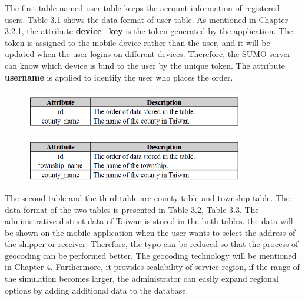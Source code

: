 \documentclass[12pt]{ksthesis}
\begin{document}
\begin{thesis}
{ 
The first table named user-table keeps the account information of registered users. Table 3.1 shows the data format of user-table. As mentioned in Chapter 3.2.1, the attribute \textbf{device\_key} is the token generated by the application. The token is assigned to the mobile device rather than the user, and it will be updated when the user logins on different devices. Therefore, the SUMO server can know which device is bind to the user by the unique token. The attribute \textbf{username} is applied to identify the user who places the order.





\begin{figure}[H]
\centering
{}
\includegraphics[width=0.85\textwidth]{./figures/Table3-2-CountyTable.PNG}
\vspace{0.5cm}
\label{Fig:CountyTable}
\end{figure}

\begin{figure}[H]
\centering
{}
\includegraphics[width=0.85\textwidth]{./figures/Table3-3-TownshipTable.PNG}
\vspace{0.5cm}
\label{Fig:TownshipTable}
\end{figure}

The second table and the third table are county table and township table. The data format of the two tables is presented in Table 3.2, Table 3.3. The administrative district data of Taiwan is stored in the both tables. the data will be shown on the mobile application when the user wants to select the address of the shipper or receiver. Therefore, the typo can be reduced so that the process of geocoding can be performed better. 
The geocoding technology will be mentioned in Chapter 4. Furthermore, it provides scalability of service region, if the range of the simulation becomes larger, the administrator can easily expand regional options by adding additional data to the database. 

}
\end{thesis}
\end{document}

